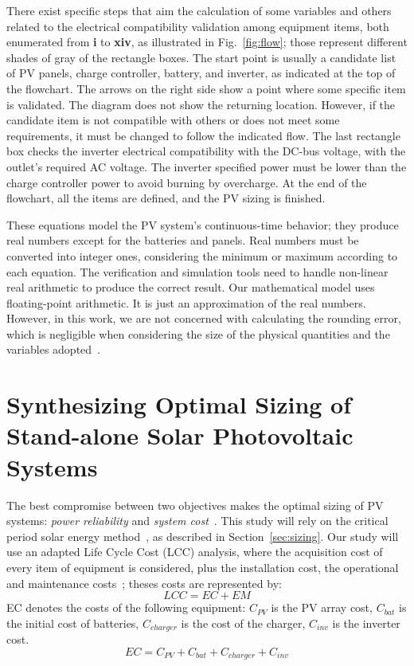 \documentclass[10pt,journal,compsoc]{IEEEtran}
\begin{document}
There exist specific steps that aim the calculation of some variables and others related to the electrical compatibility validation among equipment items, both enumerated from \textbf{i} to \textbf{xiv}, as illustrated in Fig.~\ref{fig:flow}; those represent different shades of gray of the rectangle boxes. The start point is usually a candidate list of PV panels, charge controller, battery, and inverter, as indicated at the top of the flowchart. The arrows on the right side show a point where some specific item is validated. The diagram does not show the returning location. However, if the candidate item is not compatible with others or does not meet some requirements, it must be changed to follow the indicated flow. The last rectangle box checks the inverter electrical compatibility with the DC-bus voltage, with the outlet's required AC voltage. The inverter specified power must be lower than the charge controller power to avoid burning by overcharge. At the end of the flowchart, all the items are defined, and the PV sizing is finished.

These equations model the PV system's continuous-time behavior; they produce real numbers except for the batteries and panels. Real numbers must be converted into integer ones, considering the minimum or maximum according to each equation. The verification and simulation tools need to handle non-linear real arithmetic to produce the correct result. Our mathematical model uses floating-point arithmetic. It is just an approximation of the real numbers. However, in this work, we are not concerned with calculating the rounding error, which is negligible when considering the size of the physical quantities and the variables adopted~\cite{DBLP:journals/corr/abs-2004-12699}.

\section{Synthesizing Optimal Sizing of Stand-alone Solar Photovoltaic Systems}
\label{sec:SynthesizingOptimalSolarPhotovoltaicSystems}

The best compromise between two objectives makes the optimal sizing of PV systems: \textit{power reliability} and \textit{system cost}~\cite{Alsadi2018}. This study will rely on the critical period solar energy method~\cite{Pinho}, as described in Section~\ref{sec:sizing}. Our study will use an adapted Life Cycle Cost (LCC) analysis, where the acquisition cost of every item of equipment is considered, plus the installation cost, the operational and maintenance costs~\cite{Alsadi2018}; theses costs are represented by:
\begin{equation}
\label{eq:LCC}
LCC = EC + EM
\end{equation}
%
\noindent EC denotes the costs of the following equipment: $C_{PV}$ is the PV array cost, $C_{bat}$ is the initial cost of batteries, $C_{charger}$ is the cost of the charger, $C_{inv}$ is the inverter cost.
\begin{equation}
\label{eq:EquipamentCost}
EC = C_{PV} + C_{bat} + C_{charger} + C_{inv}
\end{equation}
\end{document}
